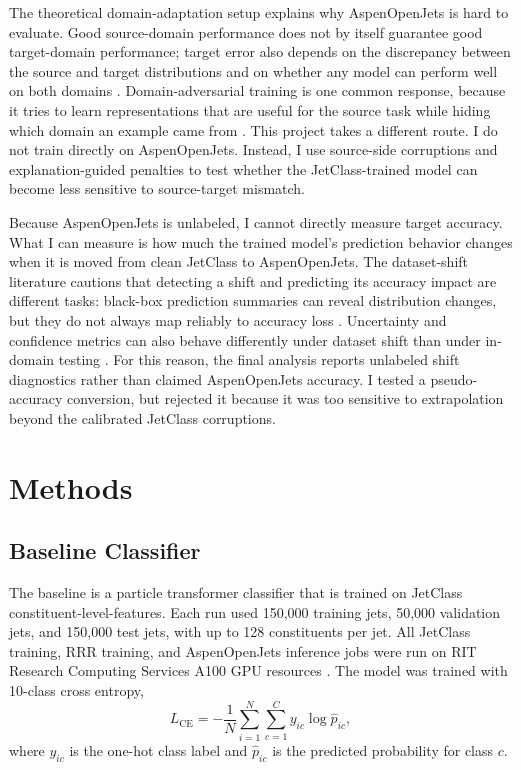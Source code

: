 \documentclass[11pt]{article}
\begin{document}
The theoretical domain-adaptation setup explains why AspenOpenJets is hard to evaluate. Good source-domain performance does not by itself guarantee good target-domain performance; target error also depends on the discrepancy between the source and target distributions and on whether any model can perform well on both domains \cite{bendavid2010theory}. Domain-adversarial training is one common response, because it tries to learn representations that are useful for the source task while hiding which domain an example came from \cite{ganin2015unsupervised}. This project takes a different route. I do not train directly on AspenOpenJets. Instead, I use source-side corruptions and explanation-guided penalties to test whether the JetClass-trained model can become less sensitive to source-target mismatch.

Because AspenOpenJets is unlabeled, I cannot directly measure target accuracy. What I can measure is how much the trained model's prediction behavior changes when it is moved from clean JetClass to AspenOpenJets. The dataset-shift literature cautions that detecting a shift and predicting its accuracy impact are different tasks: black-box prediction summaries can reveal distribution changes, but they do not always map reliably to accuracy loss \cite{rabanser2019failing,guillory2021predicting}. Uncertainty and confidence metrics can also behave differently under dataset shift than under in-domain testing \cite{ovadia2019trust}. For this reason, the final analysis reports unlabeled shift diagnostics rather than claimed AspenOpenJets accuracy. I tested a pseudo-accuracy conversion, but rejected it because it was too sensitive to extrapolation beyond the calibrated JetClass corruptions.


\section{Methods}

\subsection{Baseline Classifier}


The baseline is a particle transformer classifier that is trained on JetClass constituent-level-features. Each run used 150,000 training jets, 50,000 validation jets, and 150,000 test jets, with up to 128 constituents per jet. All JetClass training, RRR training, and AspenOpenJets inference jobs were run on RIT Research Computing Services A100 GPU resources \cite{ritrc2026}. The model was trained with 10-class cross entropy,
\begin{equation}
L_{\mathrm{CE}} = -\frac{1}{N}\sum_{i=1}^{N}\sum_{c=1}^{C} y_{ic}\log \hat{p}_{ic},
\end{equation}
where $y_{ic}$ is the one-hot class label and $\hat{p}_{ic}$ is the predicted probability for class $c$.
\end{document}
